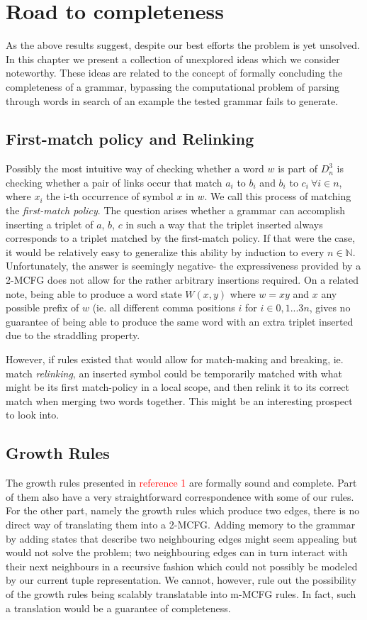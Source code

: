\documentclass[nonatbib,numbers,10pt]{sigplanconf}
\newcommand\todo[1]{\textcolor{red}{#1}}
\begin{document}
\section{Road to completeness}
As the above results suggest, despite our best efforts the problem is yet unsolved. In this chapter we present a collection of unexplored ideas which we consider noteworthy. These ideas are related to the concept of formally concluding the completeness of a grammar, bypassing the computational problem of parsing through words in search of an example the tested grammar fails to generate.

\subsection{First-match policy and Relinking}
Possibly the most intuitive way of checking whether a word $w$ is part of $D^3_n$ is checking whether a pair of links occur that match $a_i$ to $b_i$ and $b_i$ to $c_i \ \forall i \in n$, where $x_i$ the i-th occurrence of symbol $x$ in $w$. We call this process of matching the \textit{first-match policy}. The question arises whether a grammar can accomplish inserting a triplet of $a$, $b$, $c$ in such a way that the triplet inserted always corresponds to a triplet matched by the first-match policy. If that were the case, it would be relatively easy to generalize this ability by induction to every $n \in \mathbb{N}$. Unfortunately, the answer is seemingly negative- the expressiveness provided by a 2-MCFG does not allow for the rather arbitrary insertions required. On a related note, being able to produce a word state $W(x,y)$ where $w=xy$ and $x$ any possible prefix of $w$ (ie. all different comma positions $i$ for $i \in 0,1...3n$, gives no guarantee of being able to produce the same word with an extra triplet inserted due to the straddling property. 

However, if rules existed that would allow for match-making and breaking, ie. match \textit{relinking}, an inserted symbol could be temporarily matched with what might be its first match-policy in a local scope, and then relink it to its correct match when merging two words together. This might be an interesting prospect to look into. 
\subsection{Growth Rules}
The growth rules presented in \todo{reference 1} are formally sound and complete. Part of them also have a very straightforward correspondence with some of our rules. For the other part, namely the growth rules which produce two edges, there is no direct way of translating them into a 2-MCFG. Adding memory to the grammar by adding states that describe two neighbouring edges might seem appealing but would not solve the problem; two neighbouring edges can in turn interact with their next neighbours in a recursive fashion which could not possibly be modeled by our current tuple representation. We cannot, however, rule out the possibility of the growth rules being scalably translatable into m-MCFG rules. In fact, such a translation would be a guarantee of completeness. 
\end{document}
